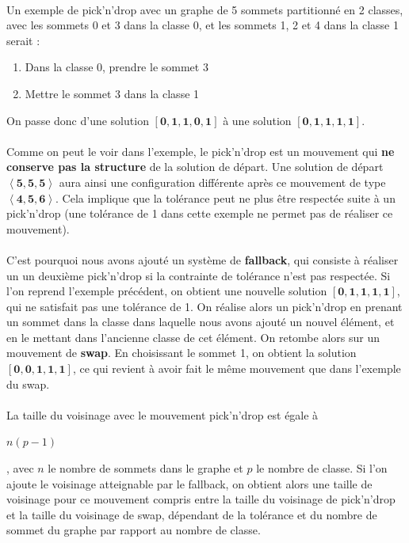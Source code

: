 \documentclass[12pt]{article}
\begin{document}
\paragraph{}Un exemple de pick'n'drop avec un graphe de 5 sommets partitionné en 2 classes, avec les sommets 0 et 3 dans la classe 0, et les sommets 1, 2 et 4 dans la classe 1 serait :
\begin{enumerate}
	\item Dans la classe 0, prendre le sommet 3
	\item Mettre le sommet 3 dans la classe 1
\end{enumerate}
On passe donc d'une solution $\mathbf{[0,1,1,0,1]}$ à une solution $\mathbf{[0,1,1,1,1]}$.

\paragraph{}Comme on peut le voir dans l'exemple, le pick'n'drop est un mouvement qui \textbf{ne conserve pas la structure} de la solution de départ. Une solution de départ $\mathbf{\left\langle 5,5,5 \right\rangle}$ aura ainsi une configuration différente après ce mouvement de type $\mathbf{\left\langle 4,5,6 \right\rangle}$. Cela implique que la tolérance peut ne plus être respectée suite à un pick'n'drop (une tolérance de 1 dans cette exemple ne permet pas de réaliser ce mouvement).
\paragraph{}C'est pourquoi nous avons ajouté un système de \textbf{fallback}, qui consiste à réaliser un un deuxième pick'n'drop si la contrainte de tolérance n'est pas respectée. Si l'on reprend l'exemple précédent, on obtient une nouvelle solution 
$\mathbf{[0,1,1,1,1]}$, qui ne satisfait pas une tolérance de 1. On réalise alors un pick'n'drop en prenant un sommet dans la classe dans laquelle nous avons ajouté un nouvel élément, et en le mettant dans l'ancienne classe de cet élément. On retombe alors sur un mouvement de \textbf{swap}. En choisissant le sommet 1, on obtient la solution $\mathbf{[0,0,1,1,1]}$, ce qui revient à avoir fait le même mouvement que dans l'exemple du swap.

\paragraph{}La taille du voisinage avec le mouvement pick'n'drop est égale à
\begin{large}$n\left(p-1\right)$\end{large}, avec $n$ le nombre de sommets dans le graphe et $p$ le nombre de classe. Si l'on ajoute le voisinage atteignable par le fallback, on obtient alors une taille de voisinage pour ce mouvement compris entre la taille du voisinage de pick'n'drop et la taille du voisinage de swap, dépendant de la tolérance et du nombre de sommet du graphe par rapport au nombre de classe.
\end{document}
